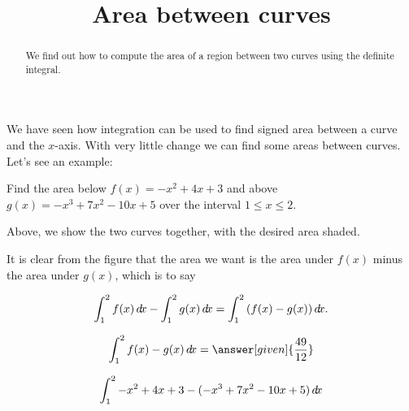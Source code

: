 \documentclass{ximera}
\title[Dig-In:]{Area between curves}
\begin{document}
\begin{abstract}
  We find out how to compute the area of a region between two curves using the definite integral.
\end{abstract}
\maketitle


We have seen how integration can be used to find signed area between a
curve and the $x$-axis. With very little change we can find some areas
between curves. Let's see an example:

\begin{example} Find the area below $f(x)= -x^2+4x+3$ and above
$g(x)=-x^3+7x^2-10x+5$ over the interval $1 \le x \le 2$. 


\begin{image}
\end{image}

\begin{explanation}
Above, we show the two curves together, with the desired area shaded.

It is clear from the figure that the area we want is the area under
$f(x)$ minus the area under $g(x)$, which is to say

\[
\int_1^2 f(x)\mathop{}\!d\! x-\int_1^2 g(x)\mathop{}\!d\! x = \int_1^2 \left(f(x)-g(x)\right)\mathop{}\!d\! x.
\]

\[ 
\int_1^2 f(x)-g(x)\d x = \answer[given]{\frac{49}{12}} 
\]
\begin{hint}

\[
\int_1^2 -x^2+4x+3-(-x^3+7x^2-10x+5) \mathop{}\!d\! x
\]


\end{hint}
\end{explanation}
\end{example}
\end{document}
